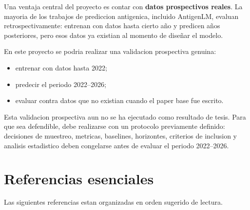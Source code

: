 \documentclass[12pt,letterpaper]{article}
\begin{document}
Una ventaja central del proyecto es contar con \textbf{datos prospectivos reales}. La mayoria de los trabajos de prediccion antigenica, incluido AntigenLM, evaluan retrospectivamente: entrenan con datos hasta cierto año y predicen años posteriores, pero esos datos ya existian al momento de diseñar el modelo.

En este proyecto se podria realizar una validacion prospectiva genuina:

\begin{itemize}[leftmargin=2em]
    \item entrenar con datos hasta 2022;
    \item predecir el periodo 2022--2026;
    \item evaluar contra datos que no existian cuando el paper base fue escrito.
\end{itemize}

Esta validacion prospectiva aun no se ha ejecutado como resultado de tesis. Para que sea defendible, debe realizarse con un protocolo previamente definido: decisiones de muestreo, metricas, baselines, horizontes, criterios de inclusion y analisis estadistico deben congelarse antes de evaluar el periodo 2022--2026.

\section{Referencias esenciales}

Las siguientes referencias estan organizadas en orden sugerido de lectura.
\end{document}
